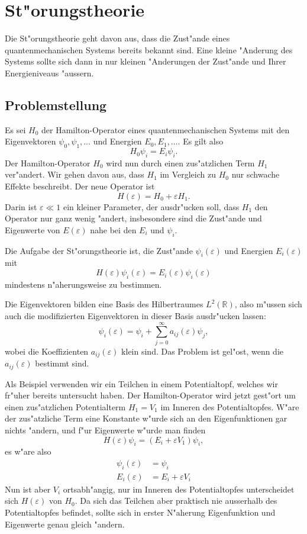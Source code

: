 \chapter{St"orungstheorie}
\rhead{}
Die St"orungstheorie geht davon aus, dass die Zust"ande eines
quantenmechanischen Systems bereits bekannt sind. Eine kleine
"Anderung des Systems sollte sich dann in nur kleinen "Anderungen
der Zust"ande und Ihrer Energieniveaus "aussern.

\section{Problemstellung}
Es sei $H_0$ der Hamilton-Operator eines quantenmechanischen Systems
mit den Eigenvektoren $\psi_0,\psi_1,\dots$ und Energien $E_0,E_1,\dots$.
Es gilt also 
\[
H_0\psi_i = E_i\psi_i.
\]
Der Hamilton-Operator $H_0$ wird nun durch einen zus"atzlichen Term
$H_1$ ver"andert. Wir gehen davon aus, dass $H_1$ im Vergleich zu
$H_0$ nur schwache Effekte beschreibt. Der neue Operator ist
\[
H(\varepsilon)=H_0+\varepsilon H_1.
\]
Darin ist $\varepsilon\ll 1$ ein kleiner Parameter, der ausdr"ucken
soll, dass $H_1$ den Operator nur ganz wenig "andert, insbesondere
sind die Zust"ande und Eigenwerte von $E(\varepsilon)$ nahe bei 
den $E_i$ und $\psi_i$.

Die Aufgabe der St"orungstheorie ist, die Zust"ande $\psi_i(\varepsilon)$
und Energien $E_i(\varepsilon)$ mit
\[
H(\varepsilon)\psi_i(\varepsilon)=E_i(\varepsilon)\psi_i(\varepsilon)
\]
mindestens n"aherungsweise zu bestimmen.

Die Eigenvektoren bilden eine Basis des Hilbertraumes $L^2(\mathbb R)$, 
also m"ussen sich auch die modifizierten Eigenvektoren in dieser Basis
ausdr"ucken lassen:
\[
\psi_i(\varepsilon)=\psi_i +\sum_{j=0}^\infty a_{ij}(\varepsilon)\psi_j,
\]
wobei die Koeffizienten $a_{ij}(\varepsilon)$ klein sind.
Das Problem ist gel"ost, wenn die $a_{ij}(\varepsilon)$ bestimmt sind.

\begin{beispiel}
Als Beispiel verwenden wir ein Teilchen in einem Potentialtopf, welches
wir fr"uher bereits untersucht haben. Der Hamilton-Operator wird jetzt
gest"ort um einen zus"atzlichen Potentialterm $H_1=V_1$ im Inneren
des Potentialtopfes.
W"are der zus"atzliche Term eine Konstante w"urde sich an den Eigenfunktionen
gar nichts "andern, und f"ur Eigenwerte w"urde man finden
\[
H(\varepsilon)\psi_i=(E_i + \varepsilon V_1)\psi_i,
\]
es w"are also
\begin{align*}
\psi_i(\varepsilon)&=\psi_i\\
E_i(\varepsilon)&=E_i+\varepsilon V_i
\end{align*}
Nun ist aber $V_i$ ortsabh"angig, nur im Inneren des Potentialtopfes 
unterscheidet sich $H(\varepsilon)$ von $H_0$. Da sich das Teilchen
aber praktisch nie ausserhalb des Potentialtopfes befindet, sollte
sich in erster N"aherung Eigenfunktion und Eigenwerte genau gleich
"andern.
\end{beispiel}



